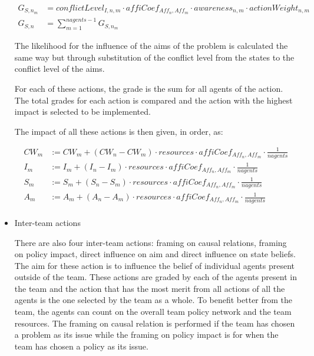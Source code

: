 \begin{itemize}
\begin{equation} \begin{split}
G_{S, n_m} &=  conflictLevel_{I, n, m} \cdot affiCoef_{Aff_n,Aff_m} \cdot awareness_{n,m} \cdot actionWeight_{n,m}\\
G_{S, n} &= \sum_{m = 1}^{nagents-1} G_{S, n_m}
\end{split} \end{equation}

The likelihood for the influence of the aims of the problem is calculated the same way but through substitution of the conflict level from the states to the conflict level of the aims.

For each of these actions, the grade is the sum for all agents of the action. The total grades for each action is compared and the action with the highest impact is selected to be implemented.

The impact of all these actions is then given, in order, as:

\begin{equation} \begin{split}
CW_{m} &:= CW_{m} + \left( CW_{n} - CW_{m} \right) \cdot resources \cdot affiCoef_{Aff_n,Aff_m} \cdot \frac{1}{nagents} \\
I_{m} &:= I_{m} +  \left(I_{n} - I_{m} \right)  \cdot resources \cdot affiCoef_{Aff_n,Aff_m} \cdot \frac{1}{nagents} \\
S_{m} &:= S_{m} + \left(S_{n} - S_{m} \right) \cdot resources \cdot affiCoef_{Aff_n,Aff_m} \cdot \frac{1}{nagents} \\
A_{m} &:= A_{m} + \left(A_{n} - A_{m} \right) \cdot resources \cdot affiCoef_{Aff_n,Aff_m} \cdot \frac{1}{nagents} \\
\end{split}\end{equation}

\item Inter-team actions

There are also four inter-team actions: framing on causal relations, framing on policy impact, direct influence on aim and direct influence on state beliefs. The aim for these action is to influence the belief of individual agents present outside of the team. These actions are graded by each of the agents present in the team and the action that has the most merit from all actions of all the agents is the one selected by the team as a whole. To benefit better from the team, the agents can count on the overall team policy network and the team resources. The framing on causal relation is performed if the team has chosen a problem as its issue while the framing on policy impact is for when the team has chosen a policy as its issue.


\end{itemize}
